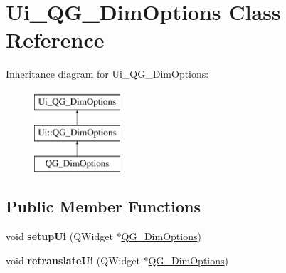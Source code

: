 \hypertarget{classUi__QG__DimOptions}{\section{Ui\-\_\-\-Q\-G\-\_\-\-Dim\-Options Class Reference}
\label{classUi__QG__DimOptions}
}
Inheritance diagram for Ui\-\_\-\-Q\-G\-\_\-\-Dim\-Options\-:\begin{figure}[H]
\begin{center}
\leavevmode
\includegraphics[height=3.000000cm]{classUi__QG__DimOptions}
\end{center}
\end{figure}
\subsection*{Public Member Functions}
\begin{DoxyCompactItemize}
\item 
\hypertarget{classUi__QG__DimOptions_ab4cd04e3d600dd5d92132a8dadb56617}{void {\bfseries setup\-Ui} (Q\-Widget $\ast$\hyperlink{classQG__DimOptions}{Q\-G\-\_\-\-Dim\-Options})}\label{classUi__QG__DimOptions_ab4cd04e3d600dd5d92132a8dadb56617}

\item 
\hypertarget{classUi__QG__DimOptions_af2ea02ca7c2dfd94bc3f3612a8df4e5d}{void {\bfseries retranslate\-Ui} (Q\-Widget $\ast$\hyperlink{classQG__DimOptions}{Q\-G\-\_\-\-Dim\-Options})}\label{classUi__QG__DimOptions_af2ea02ca7c2dfd94bc3f3612a8df4e5d}

\end{DoxyCompactItemize}
